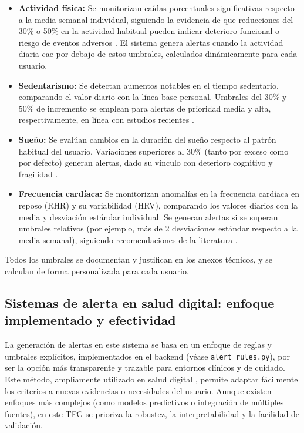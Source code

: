 \begin{itemize}
    \item \textbf{Actividad física:} Se monitorizan caídas porcentuales significativas respecto a la media semanal individual, siguiendo la evidencia de que reducciones del 30\% o 50\% en la actividad habitual pueden indicar deterioro funcional o riesgo de eventos adversos \cite{rebelo_physical_inactivity_consequences_2020, who_guidelines_2020}. El sistema genera alertas cuando la actividad diaria cae por debajo de estos umbrales, calculados dinámicamente para cada usuario.
    \item \textbf{Sedentarismo:} Se detectan aumentos notables en el tiempo sedentario, comparando el valor diario con la línea base personal. Umbrales del 30\% y 50\% de incremento se emplean para alertas de prioridad media y alta, respectivamente, en línea con estudios recientes \cite{bellettiere_pa_sedentary_aging_women_2017}.
    \item \textbf{Sueño:} Se evalúan cambios en la duración del sueño respecto al patrón habitual del usuario. Variaciones superiores al 30\% (tanto por exceso como por defecto) generan alertas, dado su vínculo con deterioro cognitivo y fragilidad \cite{nsf_older_adult_sleep_2022, westman_sleep_cognition_nordic_2024, pinto_sleep_frailty_review_2025}.
    \item \textbf{Frecuencia cardíaca:} Se monitorizan anomalías en la frecuencia cardíaca en reposo (RHR) y su variabilidad (HRV), comparando los valores diarios con la media y desviación estándar individual. Se generan alertas si se superan umbrales relativos (por ejemplo, más de 2 desviaciones estándar respecto a la media semanal), siguiendo recomendaciones de la literatura \cite{kang_hrv_thresholds_mortality_2021, shaffer_overview_hrv_2017}.
\end{itemize}

Todos los umbrales se documentan y justifican en los anexos técnicos, y se calculan de forma personalizada para cada usuario.

\subsection{Sistemas de alerta en salud digital: enfoque implementado y efectividad}
\label{subsec:sistemas_alerta_comparativa}

La generación de alertas en este sistema se basa en un enfoque de reglas y umbrales explícitos, implementados en el backend (véase \texttt{alert\_rules.py}), por ser la opción más transparente y trazable para entornos clínicos y de cuidado. Este método, ampliamente utilizado en salud digital \cite{alam_alert_systems_review_2019}, permite adaptar fácilmente los criterios a nuevas evidencias o necesidades del usuario. Aunque existen enfoques más complejos (como modelos predictivos o integración de múltiples fuentes), en este TFG se prioriza la robustez, la interpretabilidad y la facilidad de validación.


